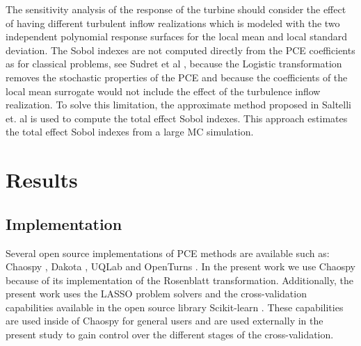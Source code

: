 \documentclass[preprint,12pt]{elsarticle}
\begin{document}

The sensitivity analysis of the response of the turbine should consider the effect of having different turbulent inflow realizations which is modeled with the two independent polynomial response surfaces for the local mean and local standard deviation. The Sobol indexes are not computed directly from the PCE coefficients as for classical problems, see Sudret et al \cite{sudret2008global}, because the Logistic transformation removes the stochastic properties of the PCE and because the coefficients of the local mean surrogate would not include the effect of the turbulence inflow realization. To solve this limitation, the approximate method proposed in Saltelli et. al \cite{saltelli2010variance} is used to compute the total effect Sobol indexes. This approach estimates the total effect Sobol indexes from a large MC simulation.



\section{Results}
\label{sec_Results}

\subsection{Implementation}

Several open source implementations of PCE methods are available such as: Chaospy \cite{feinberg2015chaospy}, Dakota \cite{eldred2007dakota}, UQLab \cite{marelli2014uqlab} and OpenTurns \cite{andrianov2007open}. In the present work we use Chaospy because of its implementation of the Rosenblatt transformation. Additionally, the present work uses the  LASSO problem solvers \cite{tibshirani1996regression} and the cross-validation capabilities available in the open source library Scikit-learn \cite{pedregosa2011scikit}. These capabilities are used inside of Chaospy for general users and are used externally in the present study to gain control over the different stages of the cross-validation.
\end{document}
